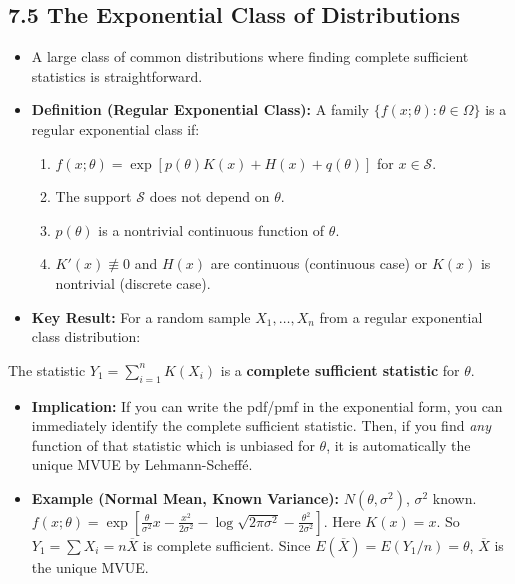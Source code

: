 \subsection{7.5 The Exponential Class of Distributions}

\begin{itemize}
	\item A large class of common distributions where finding complete sufficient statistics is straightforward.
	\item \textbf{Definition (Regular Exponential Class):} A family $\{f(x; \theta): \theta \in \Omega\}$ is a regular exponential class if:
	\begin{enumerate}
		\item $f(x; \theta) = \exp[p(\theta) K(x) + H(x) + q(\theta)]$ for $x \in \mathcal{S}$.
		\item The support $\mathcal{S}$ does not depend on $\theta$.
		\item $p(\theta)$ is a nontrivial continuous function of $\theta$.
		\item $K'(x) \not\equiv 0$ and $H(x)$ are continuous (continuous case) or $K(x)$ is nontrivial (discrete case).
	\end{enumerate}
	\item \textbf{Key Result:} For a random sample $X_1, \dots, X_n$ from a regular exponential class distribution:
\end{itemize}

\begin{theorem}
The statistic $Y_1 = \sum_{i=1}^n K(X_i)$ is a \textbf{complete sufficient statistic} for $\theta$.
\end{theorem}
\begin{itemize}
	\item \textbf{Implication:} If you can write the pdf/pmf in the exponential form, you can immediately identify the complete sufficient statistic. Then, if you find \textit{any} function of that statistic which is unbiased for $\theta$, it is automatically the unique MVUE by Lehmann-Scheffé.
	\item \textbf{Example (Normal Mean, Known Variance):} $N(\theta, \sigma^2)$, $\sigma^2$ known.
$f(x; \theta) = \exp\left[ \frac{\theta}{\sigma^2} x - \frac{x^2}{2\sigma^2} - \log\sqrt{2\pi\sigma^2} - \frac{\theta^2}{2\sigma^2} \right]$.
Here $K(x) = x$. So $Y_1 = \sum X_i = n\overline{X}$ is complete sufficient.
Since $E(\overline{X}) = E(Y_1/n) = \theta$, $\overline{X}$ is the unique MVUE.
\end{itemize}

